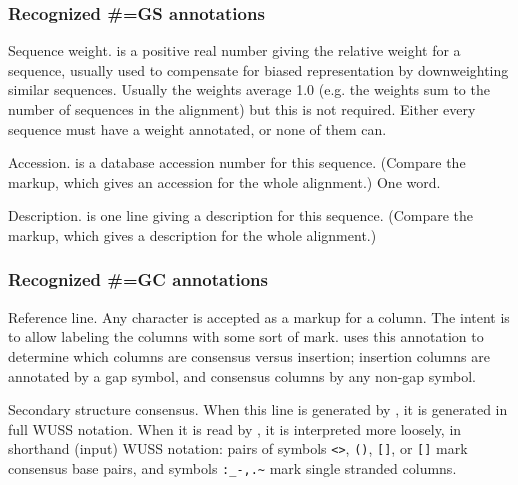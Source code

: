 \subsubsection{Recognized \#=GS annotations}

\begin{sreitems}{}
\item [\emprog{WT  <f>}]
	Sequence weight.  is a positive real number giving the
	relative weight for a sequence, usually used to compensate
	for biased representation by downweighting similar sequences.	
	Usually the weights average 1.0 (e.g. the weights sum to
	the number of sequences in the alignment) but this is not
	required. Either every sequence must have a weight annotated, 
	or none	of them can.  

\item [\emprog{AC  <s>}]
	Accession.  is a database accession number for 
	this sequence. (Compare the  markup, which gives
	an accession for the whole alignment.) One word. 
	
\item [\emprog{DE  <s>}]
	Description.  is one line giving a description for
	this sequence. (Compare the  markup, which gives
	a description for the whole alignment.)
\end{sreitems}

\subsubsection{Recognized \#=GC annotations}

\begin{sreitems}{}
\item [\emprog{RF}]
	Reference line. Any character is accepted as a markup for a
	column. The intent is to allow labeling the columns with some
	sort of mark.  uses this annotation to 
        determine which columns are consensus versus insertion;
        insertion columns are annotated by a gap symbol, and consensus
        columns by any non-gap symbol.
	
\item [\emprog{SS\_cons}]
	Secondary structure consensus. 
        When this line is generated by , it is generated in full WUSS
        notation.
	When it is read by , it is interpreted more
        loosely, in shorthand (input) WUSS notation:
	pairs of symbols \verb+<>+, \verb+()+, \verb+[]+, or \verb+[]+ mark
	consensus base pairs, and symbols \verb+:_-,.~+ mark single
        stranded columns. 
\end{sreitems}

